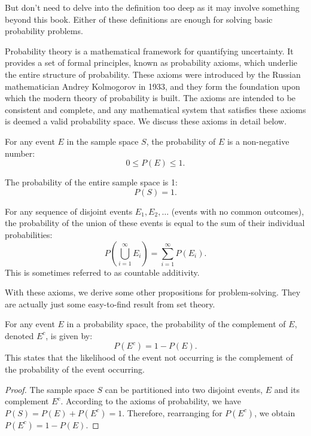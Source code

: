     But don't need to delve into the definition too deep as it may involve something
    beyond this book. Either of these definitions are enough for solving basic
    probability problems.

    Probability theory is a mathematical framework for quantifying uncertainty. It provides a set of formal principles, known as probability axioms, which underlie the entire structure of probability. These axioms were introduced by the Russian mathematician Andrey Kolmogorov in 1933, and they form the foundation upon which the modern theory of probability is built. The axioms are intended to be consistent and complete, and any mathematical system that satisfies these axioms is deemed a valid probability space. We discuss these axioms in detail below.

    \begin{axiom}
    For any event \( E \) in the sample space \( S \), the probability of \( E \) is a non-negative number:
    \[0\leq P(E) \leq 1. \]
    \end{axiom}

    \begin{axiom}
    The probability of the entire sample space is 1:
    \[ P(S) = 1. \]
    \end{axiom}

    \begin{axiom}[Additivity]\label{additivity}
    For any sequence of disjoint events \( E_1, E_2, \ldots \) (events with no common outcomes), the probability of the union of these events is equal to the sum of their individual probabilities:
    \[ P\left(\bigcup_{i=1}^{\infty} E_i\right) = \sum_{i=1}^{\infty} P(E_i). \]
    This is sometimes referred to as countable additivity.
    \end{axiom}

    With these axioms, we derive some other propositions for problem-solving. 
    They are actually just some easy-to-find result from set theory.

    \begin{proposition}
    For any event \( E \) in a probability space, the probability of the complement of \( E \), denoted \( E^c \), is given by:
    \[ P(E^c) = 1 - P(E). \]
    This states that the likelihood of the event not occurring is the complement of the probability of the event occurring.
    \end{proposition}
    
    \begin{proof}
    The sample space \( S \) can be partitioned into two disjoint events, \( E \) and its complement \( E^c \). According to the axioms of probability, we have \( P(S) = P(E) + P(E^c) = 1 \). Therefore, rearranging for \( P(E^c) \), we obtain \( P(E^c) = 1 - P(E) \).
    \end{proof}
    

